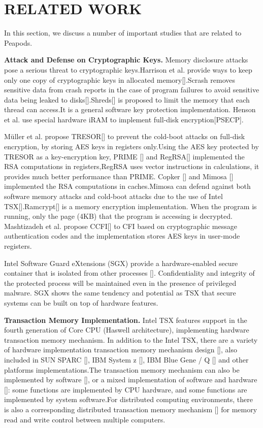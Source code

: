 
\section{RELATED WORK}
In this section, we discuss a number of important studies that are related to Peapods.

\textbf{Attack and Defense on Cryptographic Keys.} 
Memory disclosure attacks pose a serious threat to cryptographic keys.Harrison et al. provide ways to keep only one copy of cryptographic keys in allocated memory[].Scrash removes sensitive data from crash reports in the case of program failures to avoid sensitive data being leaked to disks[].Shreds[] is proposed to limit the memory that each thread can access.It is a general software key protection implementation. Henson et al. use special hardware iRAM to implement full-disk encryption[PSECP].
 
M{\"u}ller et al. propose TRESOR[] to prevent the cold-boot attacks on full-disk encryption, by storing AES keys in registers only.Using the AES key protected by TRESOR as a key-encryption key, PRIME [] and RegRSA[] implemented the RSA computations in registers,RegRSA uses vector instructions in calculations, it provides much better performance than PRIME.  Copker [] and Mimosa [] implemented the RSA computations in caches.Mimosa can defend against both software memory attacks and cold-boot attacks due to the use of Intel TSX[].Ramcrypt[] is a memory encryption implementation. When the program is running, only the page (4KB) that the program is accessing is decrypted. Mashtizadeh et al. propose CCFI[] to CFI based on cryptographic message authentication codes and the implementation stores AES keys in user-mode registers.

Intel Software Guard eXtensions (SGX) provide a hardware-enabled secure container that is isolated from other processes []. Confidentiality and integrity of the protected process will be maintained even in the presence of privileged malware. SGX shows the same tendency and potential as TSX that secure systems can be built on top of hardware features.

\textbf{Transaction Memory Implementation.}
Intel TSX features support in the fourth generation of Core CPU (Haswell architecture), implementing hardware transaction memory mechanism. In addition to the Intel TSX, there are a variety of hardware implementation transaction memory mechanism design [], also included in SUN SPARC [], IBM System z [], IBM Blue Gene / Q [] and other platforms implementations.The transaction memory mechanism can also be implemented by software [], or a mixed implementation of software and hardware []: some functions are implemented by CPU hardware, and some functions are implemented by system software.For distributed computing environments, there is also a corresponding distributed transaction memory mechanism [] for memory read and write control between multiple computers.


